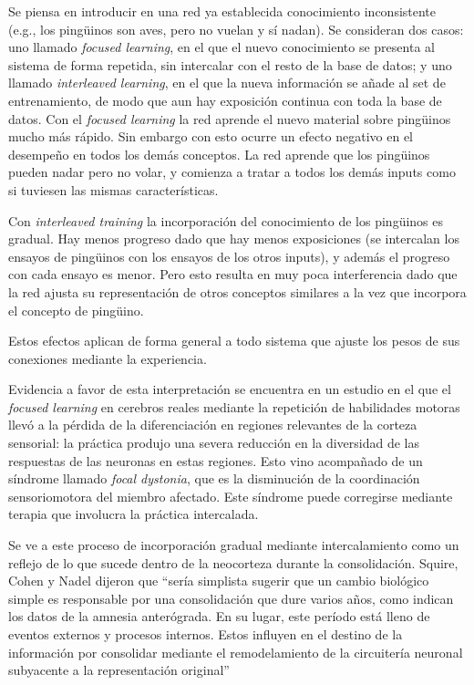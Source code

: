 \documentclass[a4paper,12pt]{article}
\begin{document}
Se piensa en introducir en una red ya establecida conocimiento inconsistente (e.g., los pingüinos son aves, pero no vuelan y sí nadan). Se consideran dos casos: uno llamado {\itshape focused learning}, en el que el nuevo conocimiento se presenta al sistema de forma repetida, sin intercalar con el resto de la base de datos; y uno llamado {\itshape interleaved learning}, en el que la nueva información se añade al set de entrenamiento, de modo que aun hay exposición continua con toda la base de datos. Con el {\itshape focused learning} la red aprende el nuevo material sobre pingüinos mucho más rápido. Sin embargo con esto ocurre un efecto negativo en el desempeño en todos los demás conceptos. La red aprende que los pingüinos pueden nadar pero no volar, y comienza a tratar a todos los demás inputs como si tuviesen las mismas características.

Con {\itshape interleaved training} la incorporación del conocimiento de los pingüinos es gradual. Hay menos progreso dado que hay menos exposiciones (se intercalan los ensayos de pingüinos con los ensayos de los otros inputs), y además el progreso con cada ensayo es menor. Pero esto resulta en muy poca interferencia dado que la red ajusta su representación de otros conceptos similares a la vez que incorpora el concepto de pingüino.

Estos efectos aplican de forma general a todo sistema que ajuste los pesos de sus conexiones mediante la experiencia. 

Evidencia a favor de esta interpretación se encuentra en un estudio en el que el {\itshape focused learning} en cerebros reales mediante la repetición de habilidades motoras llevó a la pérdida de la diferenciación en regiones relevantes de la corteza sensorial: la práctica produjo una severa reducción en la diversidad de las respuestas de las neuronas en estas regiones. Esto vino acompañado de un síndrome llamado {\itshape focal dystonia}, que es la disminución de la coordinación sensoriomotora del miembro afectado. Este síndrome puede corregirse mediante terapia que involucra la práctica intercalada.

Se ve a este proceso de incorporación gradual mediante intercalamiento como un reflejo de lo que sucede dentro de la neocorteza durante la consolidación. Squire, Cohen y Nadel dijeron que ``sería simplista sugerir que un cambio biológico simple es responsable por una consolidación que dure varios años, como indican los datos de la amnesia anterógrada. En su lugar, este período está lleno de eventos externos y procesos internos. Estos influyen en el destino de la información por consolidar mediante el remodelamiento de la circuitería neuronal subyacente a la representación original''
\end{document}
